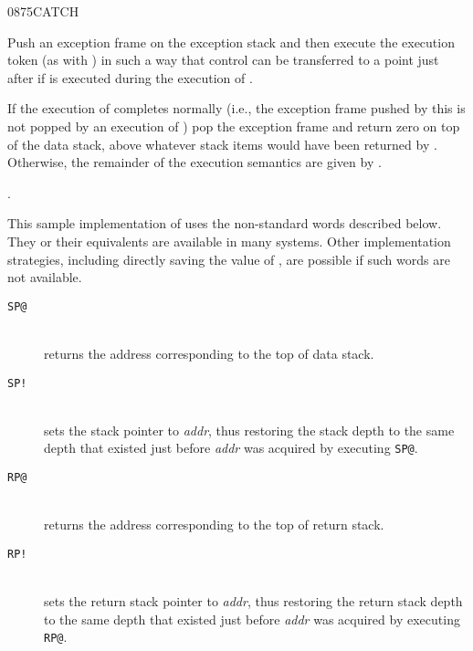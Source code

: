 \begin{worddef}{0875}{CATCH}
\item {}

	Push an exception frame on the exception stack and then execute
	the execution token  (as with ) in
	such a way that control can be transferred to a point just after
	 if  is executed during the execution of
	.

	If the execution of  completes normally (i.e., the
	exception frame pushed by this  is not popped by an
	execution of ) pop the exception frame and return
	zero on top of the data stack, above whatever stack items would
	have been returned by  . Otherwise,
	the remainder of the execution semantics are given by
	.

\see {}.

	\begin{implement} %
	\dffamily
		This sample implementation of  uses the non-standard
		words described below.  They or their equivalents are available in many
		systems.  Other implementation strategies, including directly saving the
		value of , are possible if such words are not available.

		\begin{description}
		\item[\texttt{SP@}]  \\
			returns the address corresponding to the top of data stack.

		\item[\texttt{SP!}]  \\
			sets the stack pointer to \emph{addr}, thus restoring the stack
			depth to the same depth that existed just before \emph{addr} was
			acquired by executing \texttt{SP@}.

		\item[\texttt{RP@}]  \\
			returns the address corresponding to the top of return stack.

		\item[\texttt{RP!}]  \\
			sets the return stack pointer to \emph{addr}, thus restoring the
			return stack depth to the same depth that existed just before
			\emph{addr} was acquired by executing \texttt{RP@}.
		\end{description}


\end{implement}
\end{worddef}
